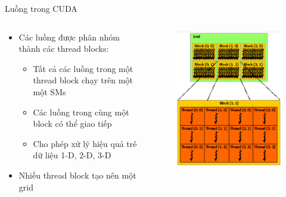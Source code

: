 \documentclass[10pt]{beamer}
\theoremstyle{remark}
\numberwithin{algocf}{section}
\numberwithin{equation}{section}
\numberwithin{dl}{section}
\numberwithin{figure}{section}
\begin{document}
\begin{frame}{Luồng trong CUDA}
    \begin{columns}[onlytextwidth]
        \begin{column}{0.5\linewidth}
            \begin{itemize}
                \item Các luồng được phân nhóm thành các thread blocks:
                \begin{itemize}
                    \item Tất cả các luồng trong một thread block chạy trên một một SMs
                    \item Các luồng trong cùng một block có thể giao tiếp
                    \item Cho phép xử lý hiệu quả trê dữ liệu 1-D, 2-D, 3-D
                \end{itemize}
                \item Nhiều thread block tạo nên một grid
            \end{itemize}
        \end{column}
        \begin{column}{0.5\linewidth}
            \begin{figure}[H]
                \centering
                \includegraphics[height=0.8\textheight]{figures/CUDA/Thread_Hierachy.png}
            \end{figure}
        \end{column}
    \end{columns}
\end{frame}
\end{document}
